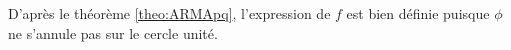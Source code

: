 \begin{remark}
D'apr\`es le th\'eor\`eme \ref{theo:ARMApq}, l'expression de $f$ est bien
d\'efinie puisque $\phi$ ne s'annule pas sur le cercle unit\'e.
\end{remark}






